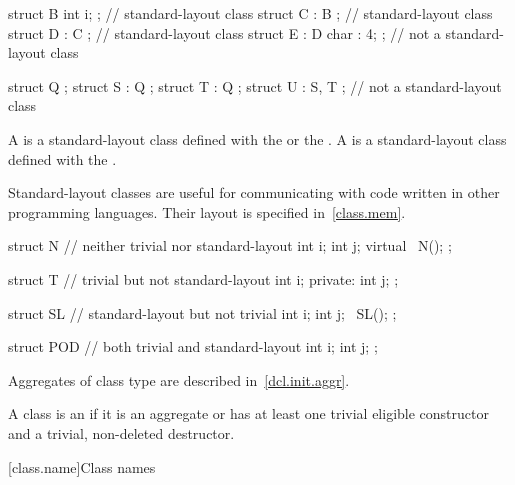 \pnum
\begin{example}
\begin{codeblock}
struct B { int i; };            // standard-layout class
struct C : B { };               // standard-layout class
struct D : C { };               // standard-layout class
struct E : D { char : 4; };     // not a standard-layout class

struct Q {};
struct S : Q { };
struct T : Q { };
struct U : S, T { };            // not a standard-layout class
\end{codeblock}
\end{example}

\pnum
A  is a standard-layout class
defined with the   or the
 .
A  is a standard-layout class
defined with the
 .

\pnum
\begin{note}
Standard-layout classes are useful for communicating with
code written in other programming languages. Their layout is specified
in~\ref{class.mem}.
\end{note}

\pnum
\begin{example}
\begin{codeblock}
struct N {          // neither trivial nor standard-layout
  int i;
  int j;
  virtual ~N();
};

struct T {          // trivial but not standard-layout
  int i;
private:
  int j;
};

struct SL {         // standard-layout but not trivial
  int i;
  int j;
  ~SL();
};

struct POD {        // both trivial and standard-layout
  int i;
  int j;
};
\end{codeblock}
\end{example}

\pnum
\begin{note}
Aggregates of class type are described in~\ref{dcl.init.aggr}.
\end{note}

\pnum
A class  is an 
if it is an aggregate or
has at least one trivial eligible constructor and
a trivial, non-deleted destructor.

[class.name]{Class names}
%
%
%

